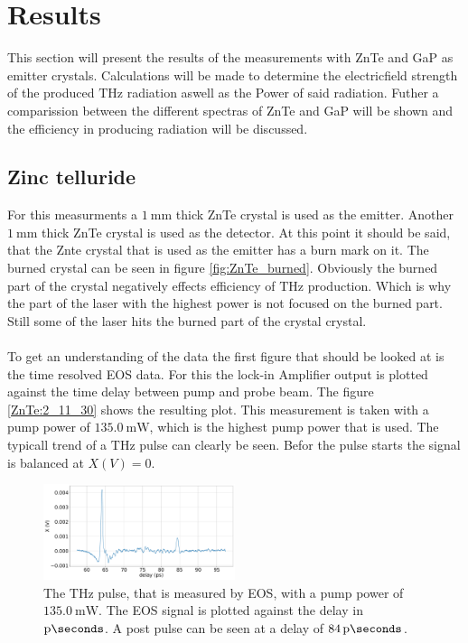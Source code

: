 \chapter{Results}
This section will present the results of the measurements with ZnTe and GaP as emitter crystals.
Calculations will be made to determine the electricfield strength of the produced $\si{\tera\hertz}$ radiation aswell as the Power of said radiation.
Futher a comparission between the different spectras of ZnTe and GaP will be shown and the efficiency in producing radiation will be discussed.

\section{Zinc telluride}
For this measurments a $\SI{1}{\milli\meter}$ thick ZnTe crystal is used as the emitter.
Another $\SI{1}{\milli\meter}$ thick ZnTe crystal is used as the detector.
At this point it should be said, that the Znte crystal that is used as the emitter has a burn mark on it.
The burned crystal can be seen in figure \ref{fig:ZnTe_burned}.
Obviously the burned part of the crystal negatively effects efficiency of $\si{\tera\hertz}$ production.
Which is why the part of the laser with the highest power is not focused on the burned part.
Still some of the laser hits the burned part of the crystal crystal.
\\\\
To get an understanding of the data the first figure that should be looked at is the time resolved EOS data.
For this the lock-in Amplifier output is plotted against the time delay between pump and probe beam.
The figure \ref{ZnTe:2_11_30} shows the resulting plot.
This measurement is taken with a pump power of $\SI{135.0}{\milli\W}$, which is the highest pump power that is used.
The typicall trend of a $\si{\tera\hertz}$ pulse can clearly be seen.
Befor the pulse starts the signal is balanced at $X(V)=0$.
\begin{figure}
    \centering
    \includegraphics[width=0.5\textwidth]{Plots/2_11_30_20normalX.pdf}
    \caption{The $\si{\tera\hertz}$ pulse, that is measured by EOS, with a pump power of $\SI{135.0}{\milli\W}$.
    The EOS signal is plotted against the delay in $\si{\pico\seconds}$.
    A post pulse can be seen at a delay of $\SI{84}{\pico\seconds}$.}
    \label{ZnTe:2_11_30_20_signal}
\end{figure}
